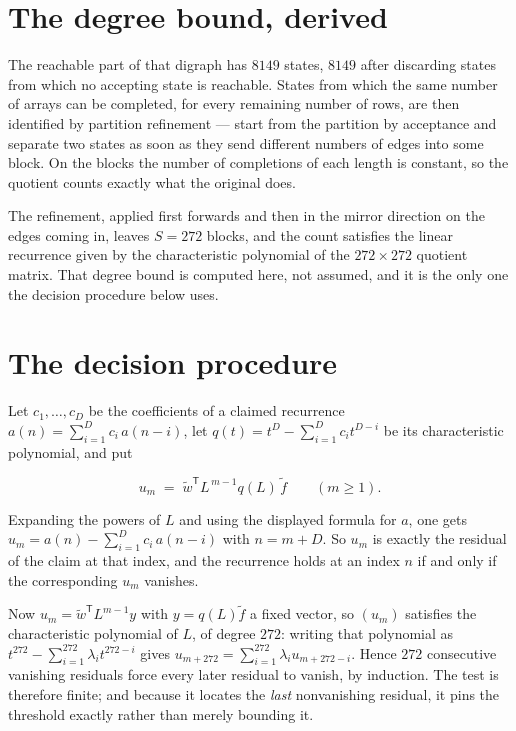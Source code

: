 \documentclass[11pt]{article}
\theoremstyle{definition}
\begin{document}
\section{The degree bound, derived}

The reachable part of that digraph has $8149$ states, $8149$ after discarding states from which no accepting state is reachable. States from which the same number of arrays can be completed, for every remaining number of rows, are then identified by partition refinement --- start from the partition by acceptance and separate two states as soon as they send different numbers of edges into some block. On the blocks the number of completions of each length is constant, so the quotient counts exactly what the original does.

The refinement, applied first forwards and then in the mirror direction on the edges coming in, leaves $S = 272$ blocks, and the count satisfies the linear recurrence given by the characteristic polynomial of the $272 \times 272$ quotient matrix. That degree bound is computed here, not assumed, and it is the only one the decision procedure below uses.

\section{The decision procedure}

Let $c_1,\dots,c_D$ be the coefficients of a claimed recurrence $a(n) = \sum_{i=1}^{D} c_i\,a(n-i)$, let $q(t) = t^{D} - \sum_{i=1}^{D} c_i t^{D-i}$ be its characteristic polynomial, and put

\[u_m \;=\; \tilde w^{\mathsf T} L^{\,m-1} q(L)\,\tilde f \qquad (m \ge 1).\]

Expanding the powers of $L$ and using the displayed formula for $a$, one gets $u_m = a(n) - \sum_{i=1}^{D} c_i\,a(n-i)$ with $n = m + D$. So $u_m$ is exactly the residual of the claim at that index, and the recurrence holds at an index $n$ if and only if the corresponding $u_m$ vanishes.

Now $u_m = \tilde w^{\mathsf T} L^{m-1} y$ with $y = q(L)\tilde f$ a fixed vector, so $(u_m)$ satisfies the characteristic polynomial of $L$, of degree $272$: writing that polynomial as $t^{272} - \sum_{i=1}^{272} \lambda_i t^{272-i}$ gives $u_{m+272} = \sum_{i=1}^{272} \lambda_i u_{m+272-i}$. Hence $272$ consecutive vanishing residuals force every later residual to vanish, by induction. The test is therefore finite; and because it locates the {\itshape last} nonvanishing residual, it pins the threshold exactly rather than merely bounding it.
\end{document}
